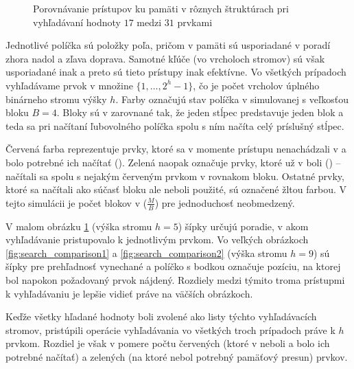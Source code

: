 \begin{figure}[h]
    \centering
    \caption[Porovnávanie prístupov ku pamäti pri vyhľadávaní hodnoty $17$]{Porovnávanie prístupov ku pamäti v rôznych štruktúrach pri vyhľadávaní hodnoty $17$ medzi $31$ prvkami}
    \label{fig:search_comparison_small}
\end{figure}

Jednotlivé políčka sú položky poľa, pričom v pamäti sú usporiadané v poradí zhora nadol a zľava doprava. Samotné kľúče (vo vrcholoch stromov) sú však usporiadané inak a preto sú tieto prístupy inak efektívne. Vo všetkých prípadoch vyhľadávame prvok v množine $\{1, \dotsc, 2^h-1\}$, čo je počet vrcholov úplného binárneho stromu výšky $h$. Farby označujú stav políčka v simulovanej \cache s veľkosťou bloku $B=4$. Bloky sú v zarovnané tak, že jeden stĺpec predstavuje jeden blok a teda sa pri načítaní ľubovolného políčka spolu s ním načíta celý príslušný stĺpec.

Červená farba reprezentuje prvky, ktoré sa v momente prístupu nenachádzali v \cache a bolo potrebné ich načítať (\miss). Zelená naopak označuje prvky, ktoré už v \cache boli (\hit) -- načítali sa spolu s nejakým červeným prvkom v rovnakom bloku. Ostatné prvky, ktoré sa načítali ako súčasť bloku ale neboli použité, sú označené žltou farbou. V tejto simulácii je počet blokov v \cache ($\frac{M}{B}$) pre jednoduchosť neobmedzený.

V malom obrázku \ref{fig:search_comparison_small} (výška stromu $h=5$) šípky určujú poradie, v akom vyhľadávanie pristupovalo k jednotlivým prvkom. Vo veľkých obrázkoch \ref{fig:search_comparison1} a \ref{fig:search_comparison2} (výška stromu $h=9$) sú šípky pre prehľadnosť vynechané a políčko s bodkou označuje pozíciu, na ktorej bol napokon požadovaný prvok nájdený. Rozdiely medzi týmito troma prístupmi k vyhľadávaniu je lepšie vidieť práve na väčších obrázkoch.

Keďže všetky hľadané hodnoty boli zvolené ako listy týchto vyhľadávacích stromov, pristúpili operácie vyhľadávania vo všetkých troch prípadoch práve k $h$ prvkom. Rozdiel je však v pomere počtu červených (ktoré v \cache neboli a bolo ich potrebné načítať) a zelených (na ktoré nebol potrebný pamäťový presun) prvkov.

